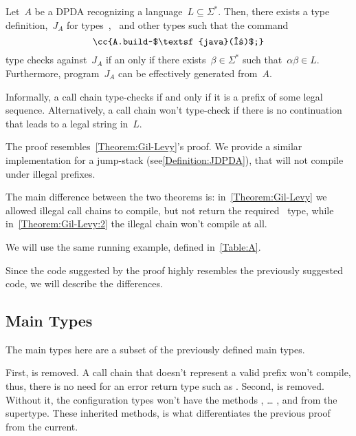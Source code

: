 \begin{theorem}\label{Theorem:Gil-Levy:2}
  Let~$A$ be a DPDA recognizing a language~$L⊆Σ^*$.
  Then, there exists a \Java type definition,~$J_A$ for types~,~ and
    other types such that the \Java command
  \begin{equation}
    \label{Equation:result}
    \cc{A.build~$\textsf{java}(α)$;}
  \end{equation}
  type checks against~$J_A$ if an only if there exists~$β∈Σ^*$ such
  that~$αβ∈L$.
  Furthermore, program~$J_A$ can be effectively generated from~$A$.
\end{theorem}

Informally, a call chain type-checks if and only if it is a prefix
  of some legal sequence.
Alternatively, a call chain won't type-check if there is no
  continuation that leads to a legal string in~$L$.

The proof resembles~\cref{Theorem:Gil-Levy}'s proof.
We provide a similar implementation for a jump-stack (see\cref{Definition:JDPDA}),
  that will not compile under illegal prefixes.

The main difference between the two theorems is:
  in~\cref{Theorem:Gil-Levy} we allowed illegal call chains to compile,
  but not return the required~ type, while in~\cref{Theorem:Gil-Levy:2}
  the illegal chain won't compile at all.
  
We will use the same running example, defined in~\cref{Table:A}.

Since the code suggested by the proof highly resembles the previously
  suggested code, we will describe the differences.
  
\subsection{Main Types}
The main types here are a subset of the previously defined main types.

\begin{quote}
\end{quote}

First,  \cc{$\Sigma\Sigma$} is removed. 
A call chain that doesn't represent a valid prefix won't compile, 
  thus, there is no need for an error return type such as \cc{$\Sigma\Sigma$}.
Second,   is removed. 
Without it, the configuration types won't have the 
  methods , … , and \cc{\$()} from the supertype.
These inherited methods, is what differentiates the previous proof from the current.

